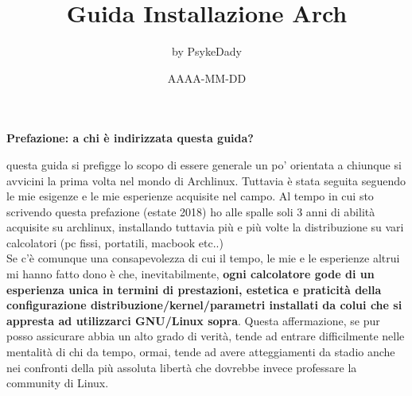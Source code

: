 \documentclass[twoside,italian]{book}
\begin{document}
	
		\posttitle{\end{center}}
	
	\begin{titlepage}
		
		
		
		\title{Guida Installazione Arch}
		
		\author{by PsykeDady}
		
		\date{AAAA-MM-DD}
		
	\end{titlepage}

	\maketitle
	\hypersetup{colorlinks=true, linkcolor=black}

	\newpage{}
	
	
	
	\begin{LARGE}
		\textbf{
			Prefazione: a chi è indirizzata questa guida?
		}


	\end{LARGE}

	questa guida si prefigge lo scopo di essere generale un po' orientata a chiunque si avvicini la prima volta nel mondo di Archlinux. Tuttavia è stata seguita seguendo le mie esigenze e le mie esperienze acquisite nel campo. Al tempo in cui sto scrivendo questa prefazione (estate 2018) ho alle spalle soli 3 anni di abilità acquisite su archlinux, installando tuttavia più e più volte la distribuzione su vari calcolatori (pc fissi, portatili, macbook etc..)\\

	Se c'è comunque una consapevolezza di cui il tempo, le mie e le esperienze altrui mi hanno fatto dono è che, inevitabilmente, \textbf{ogni calcolatore gode di un esperienza unica in termini di prestazioni, estetica e praticità della configurazione distribuzione/kernel/parametri installati da colui che si appresta ad utilizzarci GNU/Linux sopra}. Questa affermazione, se pur posso assicurare abbia un alto grado di verità, tende ad entrare difficilmente nelle mentalità di chi da tempo, ormai, tende ad avere atteggiamenti da stadio anche nei confronti della più assoluta libertà che dovrebbe invece professare la community di Linux.\\
\end{document}
